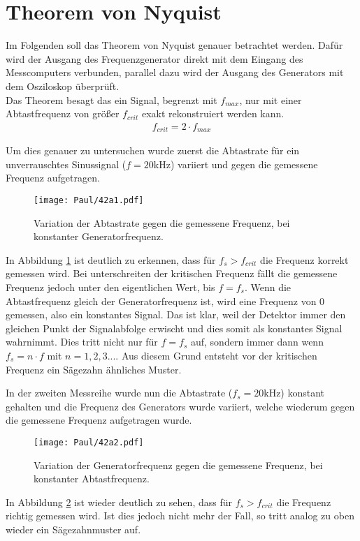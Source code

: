 \section{Theorem von Nyquist}

Im Folgenden soll das Theorem von Nyquist genauer betrachtet werden. Dafür wird der Ausgang des Frequenzgenerator direkt mit dem Eingang des Messcomputers verbunden, parallel dazu wird der Ausgang des Generators mit dem Osziloskop überprüft.\\
Das Theorem besagt das ein Signal, begrenzt mit $f_{max}$, nur mit einer Abtastfrequenz von größer $f_{crit}$ exakt rekonstruiert werden kann.
\begin{align}
    f_{crit} = 2 \cdot f_{max}
\end{align}


Um dies genauer zu untersuchen wurde zuerst die Abtastrate für ein unverrauschtes Sinussignal ($f = 20$kHz) variiert und gegen die gemessene Frequenz aufgetragen.
\begin{figure}[h]
    \centering
    \texttt{[image: Paul/42a1.pdf]}
    \caption{Variation der Abtastrate gegen die gemessene Frequenz, bei konstanter Generatorfrequenz.}
    \label{fig:42a1}
\end{figure}

In Abbildung \ref{fig:42a1} ist deutlich zu erkennen, dass für $f_s > f_{crit}$ die Frequenz korrekt gemessen wird. Bei unterschreiten der kritischen Frequenz fällt die gemessene Frequenz jedoch unter den eigentlichen Wert, bis $f = f_s$. Wenn die Abtastfrequenz gleich der Generatorfrequenz ist, wird eine Frequenz von 0 gemessen, also ein konstantes Signal. Das ist klar, weil der Detektor immer den gleichen Punkt der Signalabfolge erwischt und dies somit als konstantes Signal wahrnimmt. Dies tritt nicht nur für $f = f_s$ auf, sondern immer dann wenn $f_s = n \cdot f$ mit $ n= 1,2,3...$. Aus diesem Grund entsteht vor der kritischen Frequenz ein Sägezahn ähnliches Muster.

\newpage
In der zweiten Messreihe wurde nun die Abtastrate ($f_s = 20$kHz) konstant gehalten und die Frequenz des Generators wurde variiert, welche wiederum gegen die gemessene Frequenz aufgetragen wurde.
\begin{figure}[h]
    \centering
    \texttt{[image: Paul/42a2.pdf]}
    \caption{Variation der Generatorfrequenz gegen die gemessene Frequenz, bei konstanter Abtastfrequenz.}
    \label{fig:42a2}
\end{figure}
In Abbildung \ref{fig:42a2} ist wieder deutlich zu sehen, dass für $f_s > f_{crit}$ die Frequenz richtig gemessen wird. Ist dies jedoch nicht mehr der Fall, so tritt analog zu oben wieder ein Sägezahnmuster auf.


